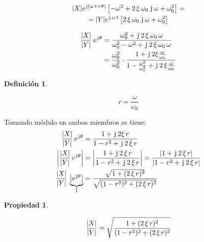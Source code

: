 \documentclass[a5paper,12pt,twoside]{book}
\newtheorem{defn}{{Definición}}[chapter]
\newtheorem{prop}{{Propiedad}}[chapter]
\begin{document}
\begin{multline*}
    {\left| {X} \right|} e^{\mkern2mu\mathrm{j}\mkern1mu (\omega \, t + \theta)} \left[ -\omega^2 + 2 \, \xi \, \omega_0 \, \mkern2mu\mathrm{j}\mkern1mu \, \omega + \omega_0^2  \right] =
    \\
    = {\left| {Y} \right|} e^{\mkern2mu\mathrm{j}\mkern1mu \, \omega \, t} \left[ 2 \, \xi \, \omega_0 \, \mkern2mu\mathrm{j}\mkern1mu \, \omega + \omega_0^2 \right]
\end{multline*}

\begin{align*}
    \frac{{\left| {X} \right|}}{{\left| {Y} \right|}} \, e^{\mkern2mu\mathrm{j}\mkern1mu\theta}
    &= \frac{\omega_0^2 + \mkern2mu\mathrm{j}\mkern1mu \, 2 \, \xi \, \omega_0 \, \omega}{\omega_0^2 - \omega^2 + \mkern2mu\mathrm{j}\mkern1mu \, 2 \, \xi \, \omega_0 \, \omega}
    \\
    &= \frac{\omega_0^2}{\omega_0^2} \cdot \frac{1+ \mkern2mu\mathrm{j}\mkern1mu \, 2 \xi \frac{\omega}{\omega_0}}{1-\frac{\omega^2}{\omega_0^2} + \mkern2mu\mathrm{j}\mkern1mu \, 2 \, \xi \frac{\omega}{\omega_0}}
\end{align*}

\begin{mdframed}[style=DefinitionFrame]
    \begin{defn}
    \end{defn}
    \begin{equation*}
        r=\frac{\omega}{\omega_0}
    \end{equation*}
\end{mdframed}

Tomando módulo en ambos miembros se tiene:
\begin{align*}
    \frac{{\left| {X} \right|}}{{\left| {Y} \right|}} \, e^{\mkern2mu\mathrm{j}\mkern1mu\theta}
    &= \frac{1+ \mkern2mu\mathrm{j}\mkern1mu \, 2 \xi \, r}{1-r^2 + \mkern2mu\mathrm{j}\mkern1mu \, 2 \, \xi \, r}
    \\
    {\left| {\frac{{\left| {X} \right|}}{{\left| {Y} \right|}} \, e^{\mkern2mu\mathrm{j}\mkern1mu\theta}} \right|}
    &= {\left| {\frac{1+ \mkern2mu\mathrm{j}\mkern1mu \, 2 \, \xi \, r}{1-r^2 + \mkern2mu\mathrm{j}\mkern1mu \, 2 \, \xi \, r}} \right|}
    = \frac{{\left| {1 + \mkern2mu\mathrm{j}\mkern1mu \, 2 \, \xi \, r} \right|}}{{\left| {1-r^2 + \mkern2mu\mathrm{j}\mkern1mu \, 2 \, \xi \, r} \right|}}
    \\
    \frac{{\left| {X} \right|}}{{\left| {Y} \right|}} \, \underbrace{{\left| {e^{\mkern2mu\mathrm{j}\mkern1mu\theta}} \right|}}_1
    &= \frac{\sqrt{1 + (2 \, \xi \, r)^2}}{\sqrt{(1-r^2)^2 + (2 \, \xi \, r)^2}}
\end{align*}

\begin{mdframed}[style=PropertyFrame]
    \begin{prop}
    \end{prop}
    \begin{equation*}
        \frac{{\left| {X} \right|}}{{\left| {Y} \right|}} = \sqrt{\frac{1 + (2 \, \xi \, r)^2}{(1-r^2)^2 + (2 \, \xi \, r)^2}}
    \end{equation*}
\end{mdframed}
\end{document}
